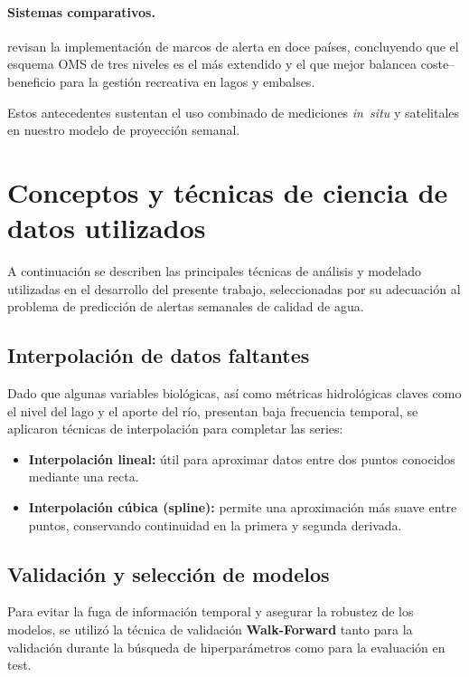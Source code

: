 \documentclass[11pt]{report}
\begin{document}
\paragraph{Sistemas comparativos.}
\citep{Hunter2022} revisan la implementación de marcos de alerta en
doce países, concluyendo que el esquema OMS de tres niveles es el más
extendido y el que mejor balancea coste–beneficio para la gestión
recreativa en lagos y embalses.

Estos antecedentes sustentan el uso combinado de mediciones
\textit{in situ} y satelitales en nuestro modelo de proyección semanal.

\section{Conceptos y técnicas de ciencia de datos utilizados}

A continuación se describen las principales técnicas de análisis y modelado utilizadas en el desarrollo del presente trabajo, seleccionadas por su adecuación al problema de predicción de alertas semanales de calidad de agua.

\subsection{Interpolación de datos faltantes}

Dado que algunas variables biológicas,  así como métricas hidrológicas claves como el nivel del lago y el aporte del río, presentan baja frecuencia temporal, se aplicaron técnicas de interpolación para completar las series:

\begin{itemize}
  \item \textbf{Interpolación lineal:} útil para aproximar datos entre dos puntos conocidos mediante una recta.
  \item \textbf{Interpolación cúbica (spline):} permite una aproximación más suave entre puntos, conservando continuidad en la primera y segunda derivada.
\end{itemize}

\subsection{Validación y selección de modelos}

Para evitar la fuga de información temporal y asegurar la robustez de los modelos, se utilizó la técnica de validación \textbf{Walk-Forward} tanto para la validación durante la búsqueda de hiperparámetros como para la evaluación en test.
\end{document}
